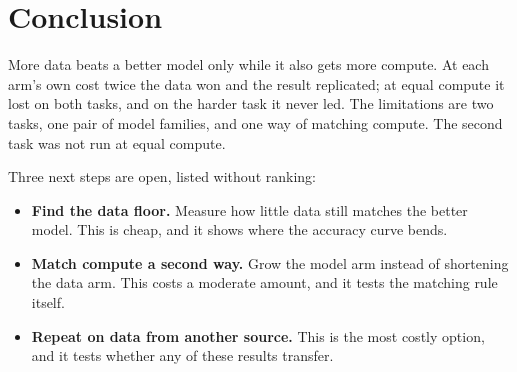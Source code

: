 \documentclass[pdflatex,sn-mathphys-num]{sn-jnl}
\begin{document}
\section{Conclusion}\label{sec:conclusion}

More data beats a better model only while it also gets more compute. At each arm's own
cost twice the data won and the result replicated; at equal compute it lost on both tasks,
and on the harder task it never led. The limitations are two tasks, one pair of model
families, and one way of matching compute. The second task was not run at equal compute.

Three next steps are open, listed without ranking:
\begin{itemize}
\item \textbf{Find the data floor.} Measure how little data still matches the better model.
This is cheap, and it shows where the accuracy curve bends.
\item \textbf{Match compute a second way.} Grow the model arm instead of shortening the data
arm. This costs a moderate amount, and it tests the matching rule itself.
\item \textbf{Repeat on data from another source.} This is the most costly option, and it
tests whether any of these results transfer.
\end{itemize}

\backmatter


\end{document}
